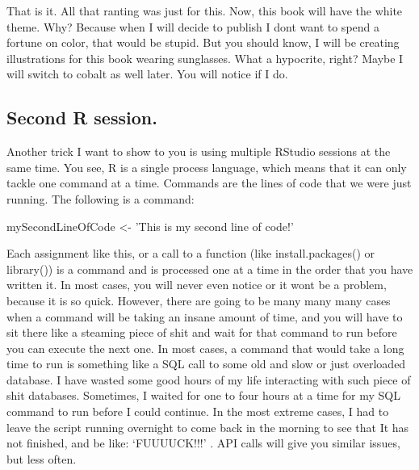 \documentclass[]{book}
\newenvironment{Shaded}{\begin{snugshade}}{\end{snugshade}}
\newcommand{\NormalTok}[1]{#1}
\newcommand{\StringTok}[1]{\textcolor[rgb]{0.31,0.60,0.02}{#1}}
\begin{document}
That is it. All that ranting was just for this. Now, this book will have the white theme. Why? Because when I will decide to publish I dont want to spend a fortune on color, that would be stupid. But you should know, I will be creating illustrations for this book wearing sunglasses. What a hypocrite, right? Maybe I will switch to cobalt as well later. You will notice if I do.

\hypertarget{second-r-session.}{%
\subsection{Second R session.}\label{second-r-session.}}

Another trick I want to show to you is using multiple RStudio sessions at the same time. You see, R is a single process language, which means that it can only tackle one command at a time. Commands are the lines of code that we were just running. The following is a command:

\begin{Shaded}
\begin{Highlighting}[]
\NormalTok{mySecondLineOfCode <-}\StringTok{ 'This is my second line of code!'}
\end{Highlighting}
\end{Shaded}

Each assignment like this, or a call to a function (like install.packages() or library()) is a command and is processed one at a time in the order that you have written it. In most cases, you will never even notice or it wont be a problem, because it is so quick. However, there are going to be many many many cases when a command will be taking an insane amount of time, and you will have to sit there like a steaming piece of shit and wait for that command to run before you can execute the next one. In most cases, a command that would take a long time to run is something like a SQL call to some old and slow or just overloaded database. I have wasted some good hours of my life interacting with such piece of shit databases. Sometimes, I waited for one to four hours at a time for my SQL command to run before I could continue. In the most extreme cases, I had to leave the script running overnight to come back in the morning to see that It has not finished, and be like: `FUUUUCK!!!'
. API calls will give you similar issues, but less often.
\end{document}
